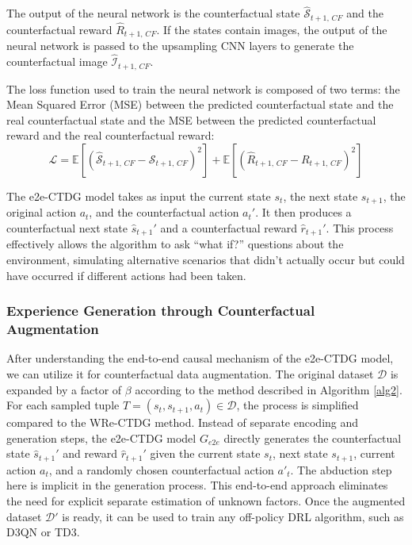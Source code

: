 The output of the neural network is the counterfactual state
$\hat{\mathcal{S}}_{t+1,\, CF}$ and the counterfactual reward
$\hat{R}_{t+1,\, CF}$.
If the states contain images, the output of the neural network
is passed to the upsampling CNN layers to generate the counterfactual
image $\hat{\mathcal{I}}_{t+1,\, CF}$.

The loss function used to train the neural network is composed of
two terms: the Mean Squared Error (MSE) between the predicted
counterfactual state and the real counterfactual state and the
MSE between the predicted counterfactual reward and the real
counterfactual reward:
\begin{equation}
    \mathcal{L} = \mathbb{E} \left[ \left( \hat{\mathcal{S}}_{t+1,\, CF} - \mathcal{S}_{t+1,\, CF} \right)^2 \right] +
    \mathbb{E} \left[ \left( \hat{R}_{t+1,\, CF} - R_{t+1,\, CF} \right)^2 \right]
\end{equation}

The e2e-CTDG model takes as input the current state $s_t$,
the next state $s_{t+1}$, the original action $a_t$,
and the counterfactual action $a_t'$. It then produces a counterfactual
next state $\hat{s}_{t+1}'$ and a counterfactual reward $\hat{r}_{t+1}'$.
This process effectively allows the algorithm to ask ``what if?''
questions about the environment, simulating alternative scenarios
that didn't actually occur but could have occurred if different actions
had been taken. 

\subsubsection{Experience Generation through Counterfactual Augmentation}

After understanding the end-to-end causal mechanism of the e2e-CTDG model,
we can utilize it for counterfactual data augmentation.
The original dataset $\mathcal{D}$ is expanded by a factor of $\beta$
according to the method described in Algorithm \ref{alg2}.
For each sampled tuple
$T = (s_t, s_{t+1}, a_t) \in \mathcal{D}$,
the process is simplified compared to the WRe-CTDG method.
Instead of separate encoding and generation steps,
the e2e-CTDG model $G_{e2e}$ directly generates the counterfactual
state $\hat{s}_{t+1}'$ and reward $\hat{r}_{t+1}'$
given the current state $s_t$, next state $s_{t+1}$,
current action $a_t$, and a randomly chosen counterfactual action $a'_t$.
The abduction step here is implicit in the generation process.
This end-to-end approach eliminates the need for explicit
separate estimation of unknown factors.
Once the augmented dataset $\mathcal{D}'$ is ready, it can be used to
train any off-policy DRL algorithm, such as D3QN or TD3.

